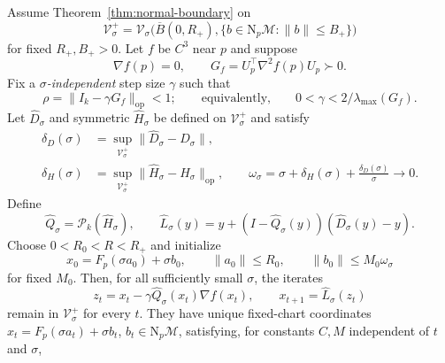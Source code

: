 \documentclass[10pt]{article}
\theoremstyle{c2fup}
\newcommand{\M}{\mathcal{M}}
\newcommand{\N}{\mathrm{N}}
\newcommand{\op}{\mathrm{op}}
\begin{document}
\begin{corollary}
\label{cor:local-invariant}
Assume Theorem~\ref{thm:normal-boundary} on
\begin{equation}
  \mathcal V_\sigma^+
  =\mathcal V_\sigma
  \bigl(\overline B(0,R_+),
        \{b\in\N_p\M:\|b\|\le B_+\}\bigr)
  \label{eq:local-query-set}
\end{equation}
for fixed $R_+,B_+>0$.  Let $f$ be $C^3$ near $p$ and suppose
\begin{equation}
  \nabla f(p)=0,\qquad
  G_f=U_p^\top\nabla^2f(p)U_p\succ0.
  \label{eq:local-objective}
\end{equation}
Fix a \emph{$\sigma$-independent} step size $\gamma$ such that
\begin{equation}
  \rho=\|I_k-\gamma G_f\|_\op<1;
  \qquad\text{equivalently,}\qquad
  0<\gamma<2/\lambda_{\max}(G_f).
  \label{eq:local-contraction}
\end{equation}
Let $\widehat D_\sigma$ and symmetric $\widehat H_\sigma$ be defined on
$\mathcal V_\sigma^+$ and satisfy
\begin{align}
  \delta_D(\sigma)
  &=\sup_{\mathcal V_\sigma^+}
    \|\widehat D_\sigma-D_\sigma\|,\nonumber\\
  \delta_H(\sigma)
  &=\sup_{\mathcal V_\sigma^+}
    \|\widehat H_\sigma-H_\sigma\|_\op,\qquad
  \omega_\sigma
  =\sigma+\delta_H(\sigma)+\frac{\delta_D(\sigma)}{\sigma}
  \longrightarrow0.
  \label{eq:local-errors}
\end{align}
Define
\begin{equation}
  \widehat Q_\sigma=\mathcal P_k(\widehat H_\sigma),
  \qquad
  \widehat L_\sigma(y)
  =y+(I-\widehat Q_\sigma(y))
       (\widehat D_\sigma(y)-y).
  \label{eq:local-learned-oracles}
\end{equation}
Choose $0<R_0<R<R_+$ and initialize
\begin{equation}
  x_0=F_p(\sigma a_0)+\sigma b_0,\qquad
  \|a_0\|\le R_0,\qquad
  \|b_0\|\le M_0\omega_\sigma
  \label{eq:local-initialization}
\end{equation}
for fixed $M_0$.  Then, for all sufficiently small $\sigma$, the iterates
\begin{equation}
  z_t=x_t-\gamma\widehat Q_\sigma(x_t)\nabla f(x_t),
  \qquad
  x_{t+1}=\widehat L_\sigma(z_t)
  \label{eq:local-scdrgd}
\end{equation}
remain in $\mathcal V_\sigma^+$ for every $t$.  They have unique
fixed-chart coordinates
$x_t=F_p(\sigma a_t)+\sigma b_t$, $b_t\in\N_p\M$, satisfying, for
constants $C,M$ independent of $t$ and $\sigma$,

\end{corollary}
\end{document}

